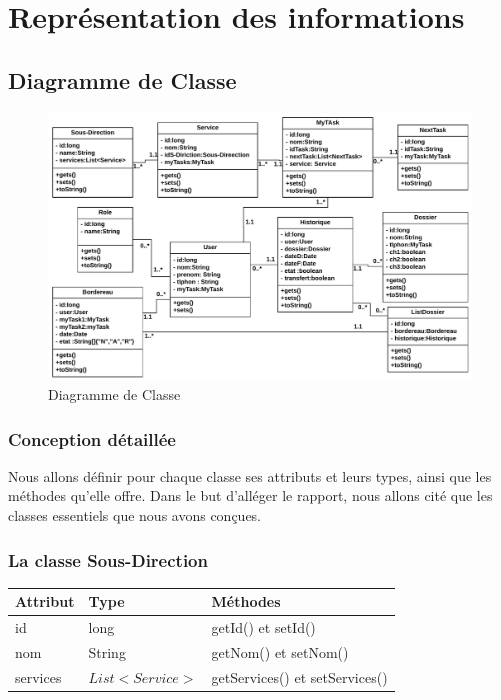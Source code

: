  \section{ Représentation des informations }
 \subsection{Diagramme de Classe}
\begin{figure}[H]
	\centering
	\includegraphics[width=1\linewidth,height=0.6\paperheight]{images/class01}
	\caption{Diagramme de Classe}
	\label{fig:class01}
\end{figure}

  \subsubsection{Conception détaillée} 
Nous allons définir pour chaque classe ses attributs et leurs types, ainsi que les méthodes qu’elle offre. Dans le but d’alléger le rapport, nous allons cité que les classes essentiels que nous avons conçues.
 
 

\subsubsection*{La classe  Sous-Direction}
\begin{table}[H]
  \centering\setlength\tabcolsep{0.8cm}
	\begin{tabular}{|l|l|l|}
		\hline
		\textbf{Attribut}  & \textbf{Type} & \multicolumn{1}{l|}{\textbf{Méthodes}} \\ \hline
	
		id & long & getId() et setId()\\ \cline{1-2}
		nom & String  & getNom() et setNom() \\ \cline{1-2}
	services	& $ List<Service> $ & getServices() et setServices()   \\ \hline
	\end{tabular}
\end{table}
